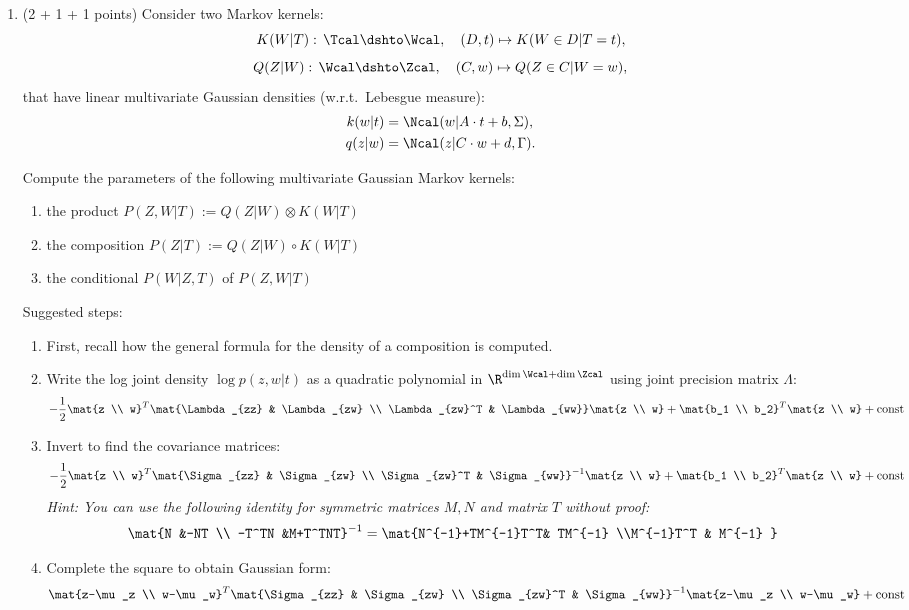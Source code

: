 \begin{enumerate}
\item (2 + 1 + 1 points) Consider two Markov kernels:
\[K(W|T):\, \Tcal \dshto \Wcal,\quad (D,t) \mapsto K(W \in D|T=t),  \]
\[Q(Z|W):\, \Wcal \dshto \Zcal,\quad (C,w) \mapsto Q(Z \in C|W=w),  \]
that have linear multivariate Gaussian densities (w.r.t.\ Lebesgue measure):
\begin{align*} 
  k(w|t) &= \Ncal(w|A \cdot t +b, \Sigma),  \\
  q(z|w) & = \Ncal(z| C \cdot w + d, \Gamma).
\end{align*}

Compute the parameters of the following multivariate Gaussian Markov kernels:
\begin{enumerate}
  \item the product $P(Z, W|T):=Q(Z|W) \otimes K(W|T)$
  \item the composition $P(Z|T):=Q(Z|W) \circ K(W|T)$
  \item the conditional $P(W|Z, T)$ of $P(Z, W|T)$
\end{enumerate}

Suggested steps:
\begin{enumerate}[label=\roman*)]
  \item First, recall how the general formula for the density of a composition is computed.
  \item Write the log joint density $\log p(z, w|t)$ as a quadratic polynomial in $\R^{\dim \Wcal + \dim \Zcal}$ using joint precision matrix $\Lambda$:
  \[ 
    -\frac{1}{2} \mat{z \\ w}^T  \mat{\Lambda_{zz} & \Lambda_{zw} \\ \Lambda_{zw}^T & \Lambda_{ww}}\mat{z \\ w} + \mat{b_1 \\ b_2}^T\mat{z \\ w} + \text{const}
  \]
  \item Invert to find the covariance matrices:
  \[ 
    -\frac{1}{2} \mat{z \\ w}^T  \mat{\Sigma_{zz} & \Sigma_{zw} \\ \Sigma_{zw}^T & \Sigma_{ww}}^{-1}\mat{z \\ w} + \mat{b_1 \\ b_2}^T\mat{z \\ w} + \text{const}
  \]
  \emph{Hint: You can use the following identity for symmetric matrices $M,N$ and matrix $T$ without proof:}
  \begin{align*}
    \mat{N &-NT \\ -T^TN  &M+T^TNT}^{-1} = \mat{N^{-1}+TM^{-1}T^T&  TM^{-1}  \\M^{-1}T^T & M^{-1} }
  \end{align*}
  \item Complete the square to obtain Gaussian form:
  \[ 
    \mat{z-\mu_z \\ w-\mu_w}^T \mat{\Sigma_{zz} & \Sigma_{zw} \\ \Sigma_{zw}^T & \Sigma_{ww}}^{-1}\mat{z-\mu_z \\ w-\mu_w} + \text{const}
  \]


\end{enumerate}
\end{enumerate}
